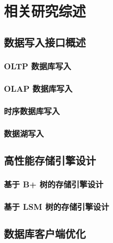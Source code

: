 
\chapter{相关研究综述}
\section{数据写入接口概述}
\subsection{OLTP 数据库写入}
\subsection{OLAP 数据库写入}
\subsection{时序数据库写入}
\subsection{数据湖写入}
\section{高性能存储引擎设计}
\subsection{基于 B+ 树的存储引擎设计}
\subsection{基于 LSM 树的存储引擎设计}
\section{数据库客户端优化}
